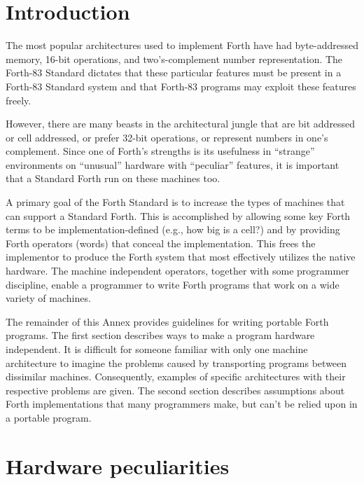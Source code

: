 \cbstart{}
\label{annex:port}
\cbend

\section{Introduction} %

The most popular architectures used to implement Forth have had
byte-addressed memory, 16-bit op\-er\-a\-tions, and two's-complement
number representation. The Forth-83 Standard dictates that these
particular features must be present in a Forth-83 Standard system
and that Forth-83 programs may exploit these features freely.

However, there are many beasts in the architectural jungle that are
bit addressed or cell addressed, or prefer 32-bit operations, or
represent numbers in one's complement. Since one of Forth's strengths
is its usefulness in ``strange'' environments on ``unusual'' hardware
with ``peculiar'' features, it is important that a Standard Forth run
on these machines too.

A primary goal of the  Forth Standard is to increase the types of
machines that can support a Standard Forth. This is accomplished by
allowing some key Forth terms to be implementation-defined (e.g., how
big is a cell?) and by providing Forth operators (words) that conceal
the implementation. This frees the implementor to produce the Forth
system that most effectively utilizes the native hardware. The machine
independent operators, together with some programmer discipline, enable
a programmer to write Forth programs that work on a wide variety of
machines.

The remainder of this Annex provides guidelines for writing portable
 Forth programs. The first section describes ways to make a program
hardware independent. It is difficult for someone familiar with only
one machine architecture to imagine the problems caused by transporting
programs between dissimilar machines. Consequently, examples of specific
architectures with their respective problems are given. The second
section describes assumptions about Forth implementations that many
programmers make, but can't be relied upon in a portable program.

\section{Hardware peculiarities} %
\label{port:hardware}

